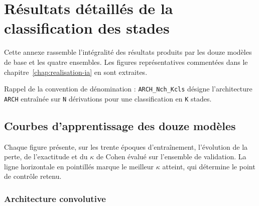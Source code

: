 \appendix

\chapter{Résultats détaillés de la classification des stades}
\label{annexe:staging}

Cette annexe rassemble l'intégralité des résultats produits par les douze modèles de
base et les quatre ensembles. Les figures représentatives commentées dans le
chapitre~\ref{chap:realisation-ia} en sont extraites.

Rappel de la convention de dénomination : \texttt{ARCH\_Nch\_Kcls} désigne
l'architecture \texttt{ARCH} entraînée sur \texttt{N} dérivations pour une
classification en \texttt{K} stades.

\section{Courbes d'apprentissage des douze modèles}

Chaque figure présente, sur les trente époques d'entraînement, l'évolution de la
perte, de l'exactitude et du $\kappa$ de Cohen évalué sur l'ensemble de validation.
La ligne horizontale en pointillés marque le meilleur $\kappa$ atteint, qui détermine
le point de contrôle retenu.

\subsection{Architecture convolutive}


